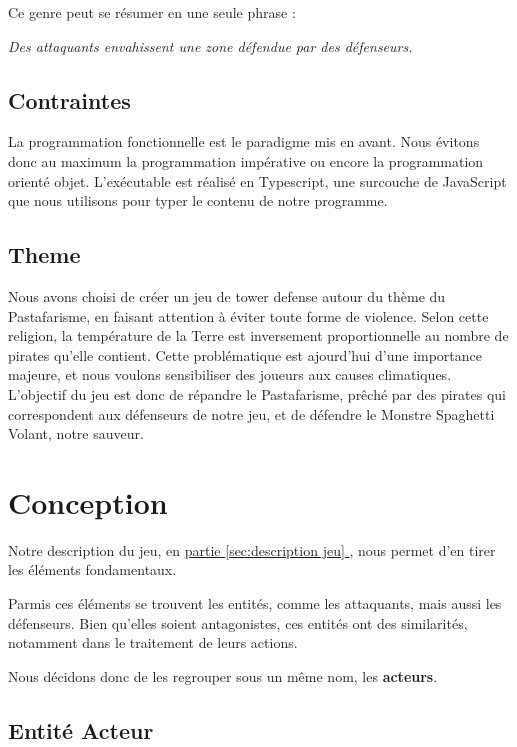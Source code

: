 \documentclass{article}
\begin{document}
Ce genre peut se résumer en une seule phrase :
\begin{center}
    \emph{Des attaquants envahissent une zone défendue par des défenseurs.}\label{sec:description jeu}
\end{center}

\subsection{Contraintes}

La programmation fonctionnelle est le paradigme mis en avant.
Nous évitons donc au maximum la programmation impérative ou encore la programmation orienté objet.
L'exécutable est réalisé en Typescript, une surcouche de JavaScript que nous utilisons pour typer le contenu de notre programme.

\subsection{Theme}
Nous avons choisi de créer un jeu de tower defense autour du thème
du Pastafarisme, en faisant attention à éviter toute forme de violence.
Selon cette religion, la température de la Terre est inversement proportionnelle 
au nombre de pirates qu'elle contient.
Cette problématique est ajourd'hui d'une importance majeure, et nous voulons sensibiliser des joueurs aux causes climatiques.
L'objectif du jeu est donc de répandre le Pastafarisme, prêché par des pirates qui correspondent aux défenseurs de notre jeu, et de défendre le Monstre Spaghetti Volant, notre sauveur. 

\section{Conception}\label{sec:conception}

Notre description du jeu, en \hyperref[sec:description jeu]{partie \ref{sec:description jeu} }, nous permet d'en tirer les éléments fondamentaux.

Parmis ces éléments se trouvent les entités, comme les attaquants, mais aussi les défenseurs. Bien qu'elles soient antagonistes, ces entités ont des similarités, notamment dans le traitement de leurs actions. 

Nous décidons donc de les regrouper sous un même nom, les \textbf{acteurs}.


\subsection{Entité Acteur}
\end{document}
